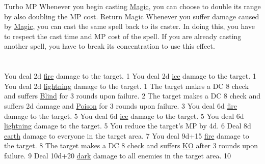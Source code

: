 {Turbo MP}
{	
	Whenever you begin casting \hyperlink{action}{Magic}, you can choose to double its range by also doubling the MP cost.
}
{Return Magic}
{	
	Whenever you suffer damage caused by \hyperlink{action}{Magic}, you can cast the same spell back to its caster.
	In doing this, you have to respect the cast time and MP cost of the spell.
	If you are already casting another spell, you have to break its concentration to use this effect. 
}
\pagebreak \\
\\\\
{
	You deal 2d \hyperlink{type}{fire} damage to the target.
}{\fire}{1}
{
	You deal 2d \hyperlink{type}{ice} damage to the target.
}{\ice}{1}
{
	You deal 2d \hyperlink{type}{lightning} damage to the target.
}{\lightning}{1}
{
	The target makes a DC 8 check and suffers \hyperlink{status}{Blind} for 3 rounds upon failure.
}{\blind}{2}
{
	The target makes a DC 8 check and suffers 2d damage and \hyperlink{status}{Poison} for 3 rounds upon failure.
}{\poison}{3}
{
	You deal 6d \hyperlink{type}{fire} damage to the target. 
}{\fire}{5}
{
	You deal 6d \hyperlink{type}{ice} damage to the target. 
}{\ice}{5}
{
	You deal 6d \hyperlink{type}{lightning} damage to the target. 
}{\lightning}{5}
{
	You reduce the target's MP by 4d.
}{}{6}
{
	Deal 8d \hyperlink{type}{earth} damage to everyone in the target area. 
}{\earth}{7}
{
	You deal 9d+15 \hyperlink{type}{fire} damage to the target. 
}{\fire}{8}
{
	The target makes a DC 8 check and suffers \hyperlink{status}{KO} after 3 rounds upon failure.
}{\ko}{9}
{
	Deal 10d+20 \hyperlink{type}{dark} damage to all enemies in the target area. 
}{\dark}{10}
\pagebreak